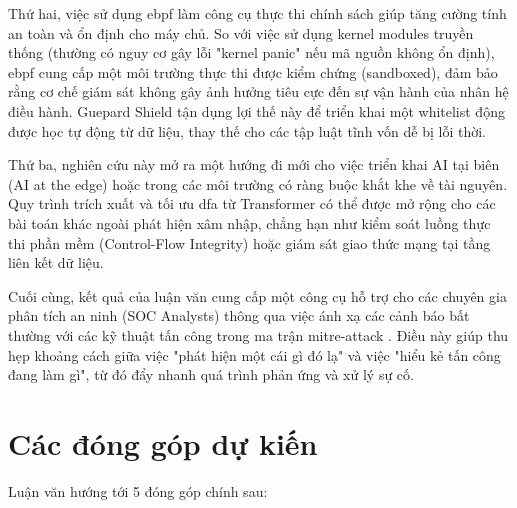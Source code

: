 \documentclass[../main.tex]{subfiles}
\begin{document}
Thứ hai, việc sử dụng \gls{ebpf} làm công cụ thực thi chính sách giúp tăng
cường tính an toàn và ổn định cho máy chủ. So với việc sử dụng kernel
modules truyền thống (thường có nguy cơ gây lỗi "kernel panic" nếu mã
nguồn không ổn định), \gls{ebpf} cung cấp một môi trường thực thi được kiểm
chứng (sandboxed), đảm bảo rằng cơ chế giám sát không gây ảnh hưởng
tiêu cực đến sự vận hành của nhân hệ điều hành. Guepard Shield tận dụng
lợi thế này để triển khai một whitelist động được học tự động từ dữ
liệu, thay thế cho các tập luật tĩnh vốn dễ bị lỗi thời.

Thứ ba, nghiên cứu này mở ra một hướng đi mới cho việc triển khai AI
tại biên (AI at the edge) hoặc trong các môi trường có ràng buộc khắt
khe về tài nguyên. Quy trình trích xuất và tối ưu \gls{dfa} từ Transformer có
thể được mở rộng cho các bài toán khác ngoài phát hiện xâm nhập, chẳng
hạn như kiểm soát luồng thực thi phần mềm (Control-Flow Integrity)
hoặc giám sát giao thức mạng tại tầng liên kết dữ liệu.

Cuối cùng, kết quả của luận văn cung cấp một công cụ hỗ trợ cho các
chuyên gia phân tích an ninh (SOC Analysts) thông qua việc ánh xạ các
cảnh báo bất thường với các kỹ thuật tấn công trong ma trận \gls{mitre-attack} \cite{strom2018mitre}. Điều này giúp thu hẹp khoảng cách giữa việc "phát hiện một cái
gì đó lạ" và việc "hiểu kẻ tấn công đang làm gì", từ đó đẩy nhanh quá
trình phản ứng và xử lý sự cố.
\newpage
\section{Các đóng góp dự kiến}
\label{sec:donggop}

Luận văn hướng tới 5 đóng góp chính sau:
\end{document}
